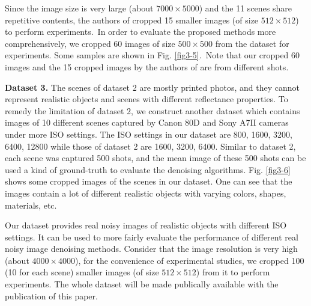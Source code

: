 Since the image size is very large (about $7000\times5000$) and the 11 scenes share repetitive contents, the authors of \cite{crosschannel2016} cropped 15 smaller images (of size $512\times512$) to perform experiments.\ In order to evaluate the proposed methods more comprehensively, we cropped 60 images of size $500\times500$ from the dataset for experiments. Some samples are shown in Fig. \ref{fig3-5}.\ Note that our cropped 60 images and the 15 cropped images by the authors of \cite{crosschannel2016} are from different shots.


\textbf{Dataset 3.} The scenes of dataset 2 are mostly printed photos, and they cannot represent realistic objects and scenes with different reflectance properties. To remedy the limitation of dataset 2, we construct another dataset which contains images of 10 different scenes captured by Canon 80D and Sony A7II cameras under more ISO settings. The ISO settings in our dataset are 800, 1600, 3200, 6400, 12800 while those of dataset 2 are 1600, 3200, 6400. Similar to dataset 2, each scene was captured 500 shots, and the mean image of these 500 shots can be used a kind of ground-truth to evaluate the denoising algorithms. Fig. \ref{fig3-6} shows some cropped images of the scenes in our dataset. One can see that the images contain a lot of different realistic objects with varying colors, shapes, materials, etc. 

Our dataset provides real noisy images of realistic objects with different ISO settings. It can be used to more fairly evaluate the performance of different real noisy image denoising methods. Consider that the image resolution is very high (about $4000\times4000$), for the convenience of experimental studies, we cropped 100 (10 for each scene) smaller images (of size $512\times512$) from it to perform experiments. The whole dataset will be made publically available with the publication of this paper.


